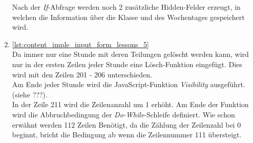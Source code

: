 \begin{enumerate}
	Nach der \textit{If}-Abfrage werden noch 2 zusätzliche Hidden-Felder erzeugt, in welchen die Information über die Klasse und des Wochentages gespeichert wird.\\
	
	\item \autoref{lst:content_imple_input_form_lessons_5}\\
	Da immer nur eine Stunde mit deren Teilungen gelöscht werden kann, wird nur in der ersten Zeilen jeder Stunde eine Lösch-Funktion eingefügt. Dies wird mit den Zeilen 201 - 206 unterschieden.\\
	Am Ende jeder Stunde wird die JavaScript-Funktion \textit{Visibility} ausgeführt. (siehe ???).\\
	In der Zeile 211 wird die Zeilenanzahl um 1 erhöht. Am Ende der Funktion wird die Abbruchbedingung der \textit{Do-While}-Schleife definiert. Wie schon erwähnt werden 112 Zeilen Benötigt, da die Zählung der Zeilenzahl bei 0 beginnt, bricht die Bedingung ab wenn die Zeilennummer 111 übersteigt.\\
	
\end{enumerate}


